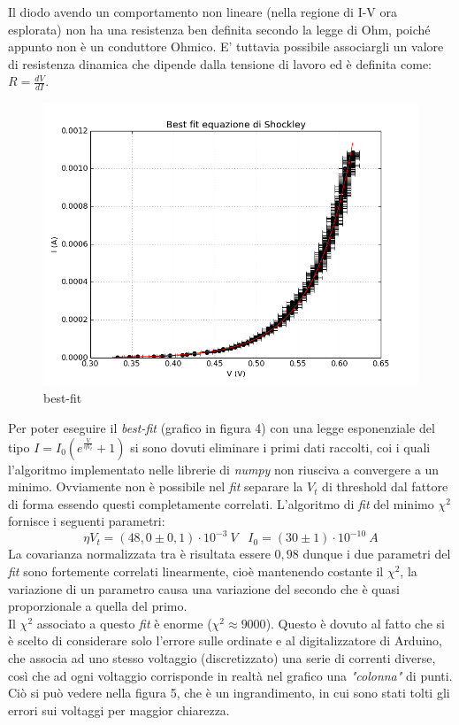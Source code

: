 \documentclass[a4paper,10pt]{article}
\begin{document}
Il diodo avendo un comportamento non lineare (nella regione di I-V ora esplorata) non ha una resistenza ben definita secondo la legge di Ohm, poiché appunto non è un conduttore Ohmico. E' tuttavia possibile associargli un valore di resistenza dinamica che dipende dalla tensione di lavoro ed è definita come: $R = \frac{dV}{dI}$.

\begin{figure}[!htb]
\begin{center}
\includegraphics[width=\textwidth]{bestFitShockley.png}
\end{center}
\caption{best-fit}
\end{figure}

Per poter eseguire il \emph{best-fit} (grafico in figura 4) con una legge esponenziale del tipo $I = I_0(e^{\frac{V}{\eta V_t}}+1)$ si sono dovuti eliminare i primi dati raccolti, coi i quali l'algoritmo implementato nelle librerie di \emph{numpy} non riusciva a convergere a un minimo. Ovviamente non è possibile nel \emph{fit} separare la $V_t$ di threshold dal fattore di forma essendo questi completamente correlati.
L'algoritmo di \emph{fit} del minimo $\chi^2$ fornisce i seguenti parametri:
\begin{equation}
\eta V_t = (48,0 \pm 0,1) \cdot 10^{-3}\:V\;\;\;I_0 =(30 \pm 1) \cdot 10^{-10}\:A
\end{equation}
La covarianza normalizzata tra è risultata essere $0,98$ dunque i due parametri del \emph{fit} sono fortemente correlati linearmente, cioè mantenendo costante il $\chi^2$, la variazione di un parametro causa una variazione del secondo che è quasi proporzionale a quella del primo.
\\
Il $\chi^2$ associato a questo \emph{fit} è enorme ($\chi^2 \approx 9000$). Questo è dovuto al fatto che si è scelto di considerare solo l'errore sulle ordinate e al digitalizzatore di Arduino, che associa ad uno stesso voltaggio (discretizzato) una serie di correnti diverse, così che ad ogni voltaggio corrisponde in realtà nel grafico una \emph{"colonna"} di punti. Ciò si può vedere nella figura 5, che è un ingrandimento, in cui sono stati tolti gli errori sui voltaggi per maggior chiarezza.
\end{document}

